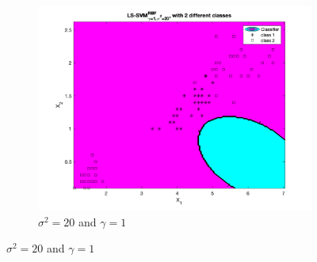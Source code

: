 \documentclass[a4paper, 11pt, one column]{article}
\begin{document}
\begin{figure}[]
\begin{subfigure}{0.33\linewidth}
            \includegraphics[width=\linewidth]{images/ls_svm_rbf_g1_s20.png}
            \caption{$\sigma^2=20$ and $\gamma=1$}
        \end{subfigure}


\end{figure}
\end{document}
